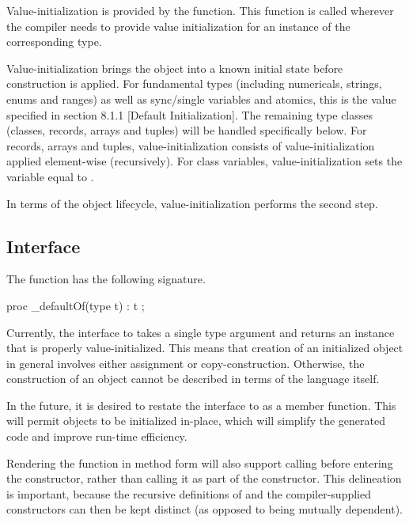 Value-initialization is provided by the  function.
This function is called wherever the compiler needs to provide value initialization
for an instance of the corresponding type.  

Value-initialization brings the object into a known initial state before
construction is applied.  For fundamental types (including numericals, strings,
enums and ranges) as well as sync/single variables and atomics, this is the
value specified in section 8.1.1 [Default Initialization].  The remaining type
classes (classes, records, arrays and tuples) will be handled specifically below.
For records, arrays and tuples, value-initialization consists of
value-initialization applied element-wise (recursively).  For class variables,
value-initialization sets the variable equal to .

In terms of the object lifecycle, value-initialization performs the second step.  

\subsection{Interface}

The  function has
the following signature.
\begin{chapel}
proc _defaultOf(type t) : t ;
\end{chapel}

\begin{future}

Currently, the interface to  takes a single type argument and
returns an instance that is properly value-initialized.  This means that
creation of an initialized object in general involves either assignment or
copy-construction.  Otherwise, the construction of an object cannot be described
in terms of the language itself.

In the future, it is desired to restate the interface to  as
a member function.  This will permit objects to be initialized in-place, which
will simplify the generated code and improve run-time efficiency.

Rendering the  function in method form will also support
calling  before entering the constructor, rather than calling
it as part of the constructor.  This delineation is important, because the
recursive definitions of  and the compiler-supplied
constructors can then be kept distinct (as opposed to being mutually dependent).

\end{future}

